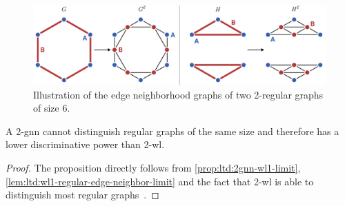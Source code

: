 \begin{figure}[ht]
	\centering
	\includegraphics[width=\linewidth]{gfx/ltd/edge-neighborhood.pdf}
	\caption{
		Illustration of the edge neighborhood graphs of two 2-regular graphs of size 6.
	}\label{fig:ltd:edge-neighborhood}
\end{figure}
\begin{prop}\label{prop:ltd:2gnn-regular-limit}
	A 2-\acs{gnn} cannot distinguish regular graphs of the same size and therefore has a lower discriminative power than 2-\ac{wl}.
\end{prop}
\begin{proof}
	The proposition directly follows from \cref{prop:ltd:2gnn-wl1-limit}, \cref{lem:ltd:wl1-regular-edge-neighbor-limit} and the fact that 2-\acs{wl} is able to distinguish most regular graphs~\cite[cor.~1.8.6]{Immerman1990}.
\end{proof}


